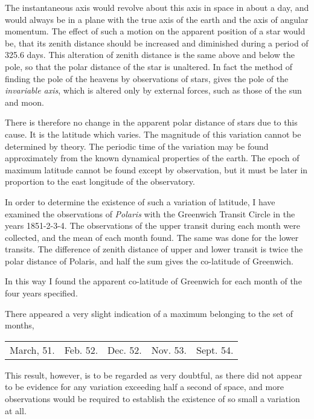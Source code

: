 \documentclass[12pt]{article}
\begin{document}
The instantaneous axis would revolve about this axis in space in about
a day, and would always be in a plane with the true axis of the earth
and the axis of angular momentum.  The effect of such a motion on the
apparent position of a star would be, that its zenith distance should
be increased and diminished during a period of 325.6 days.  This
alteration of zenith distance is the same above and below the pole, so
that the polar distance of the star is unaltered.  In fact the method
of finding the pole of the heavens by observations of stars, gives the
pole of the \emph{invariable axis}, which is altered only by external
forces, such as those of the sun and moon.

There is therefore no change in the apparent polar distance of stars
due to this cause.  It is the latitude which varies.  The magnitude of
this variation cannot be determined by theory.  The periodic time of
the variation may be found approximately from the known dynamical
properties of the earth.  The epoch of maximum latitude cannot be
found except by observation, but it must be later in proportion to the
east longitude of the observatory.

In order to determine the existence of such a variation of latitude, I
have examined the observations of \emph{Polaris} with the Greenwich
Transit Circle in the years 1851-2-3-4.  The observations of the upper
transit during each month were collected, and the mean of each month
found.  The same was done for the lower transits.  The difference of
zenith distance of upper and lower transit is twice the polar distance
of Polaris, and half the sum gives the co-latitude of Greenwich.

In this way I found the apparent co-latitude of Greenwich for each
month of the four years specified.

There appeared a very slight indication of a maximum belonging to the
set of months,

\begin{center}
\begin{tabular}{ccccc}
March,	51.  & Feb.  52.  & Dec.  52.  & Nov.  53.  & Sept.  54.
\end{tabular}
\end{center}

This result, however, is to be regarded as very doubtful, as there did
not appear to be evidence for any variation exceeding half a second of
space, and more observations would be required to establish the
existence of so small a variation at all.
\end{document}
